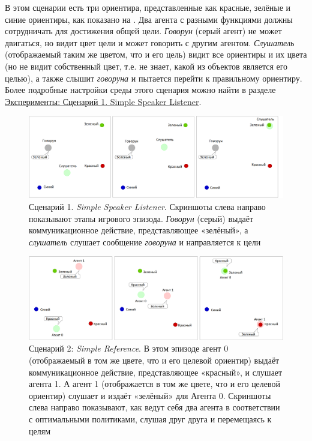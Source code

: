 В этом сценарии есть три ориентира, представленные как красные, зелёные и синие ориентиры, как показано на . Два агента с разными функциями должны сотрудничать для достижения общей цели. \textit{Говорун} (серый агент) не может двигаться, но видит цвет цели и может говорить с другим агентом. \textit{Слушатель} (отображаемый таким же цветом, что и его цель) видит все ориентиры и их цвета (но не видит собственный цвет, т.е. не знает, какой из объектов является его целью), а также слышит \textit{говоруна} и пытается перейти к правильному ориентиру. Более подробные настройки среды этого сценария можно найти в разделе \hyperref[exp-ssl]{Эксперименты: Сценарий 1. Simple Speaker Listener}.

\begin{figure}[ht!] 
	\center
	\includegraphics [scale=0.41] {my_folder/images/intro/ssl.png}
	\caption{Сценарий 1. \textit{Simple Speaker Listener}. Скриншоты слева направо показывают этапы игрового эпизода. \textit{Говорун} (серый) выдаёт коммуникационное действие, представляющее «зелёный», а \textit{слушатель} слушает сообщение \textit{говоруна} и направляется к цели}
	\label{fig-intro-ssl}
\end{figure}

\begin{figure}[ht!] 
	\center
	\includegraphics [scale=0.38] {my_folder/images/intro/sr.png}
	\caption{Сценарий 2: \textit{Simple Reference}. В этом эпизоде агент 0 (отображаемый в том же цвете, что и его целевой ориентир) выдаёт коммуникационное действие, представляющее «красный», и слушает агента 1. А агент 1 (отображается в том же цвете, что и его целевой ориентир) слушает и издаёт «зелёный» для Агента 0. Скриншоты слева направо показывают, как ведут себя два агента в соответствии с оптимальными политиками, слушая друг друга и перемещаясь к целям}
	\label{fig-intro-sr}
\end{figure}

